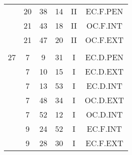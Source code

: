 \documentclass[12pt, a4paper]{article}
\begin{document}
\begin{multicols}{3}
{\begin{tabular}{c c c c c c}
	 	 	 	 & 20 & 38 & 14 & II & EC.F.PEN\\%
	 	 	 	 & 21 & 43 & 18 & II & OC.F.INT\\%
	 	 	 	 & 21 & 47 & 20 & II & OC.F.EXT\\%
	 	 	 	 & & & & & \\%
	 	 	 	27 & 7 & 9 & 31 & I & EC.D.PEN\\%
	 	 	 	 & 7 & 10 & 15 & I & EC.D.EXT\\%
	 	 	 	 & 7 & 13 & 53 & I & EC.D.INT\\%
	 	 	 	 & 7 & 48 & 34 & I & OC.D.EXT\\%
	 	 	 	 & 7 & 52 & 12 & I & OC.D.INT\\%
	 	 	 	 & 9 & 24 & 52 & I & EC.F.INT\\%
	 	 	 	 & 9 & 28 & 30 & I & EC.F.EXT\\%
	 	 \end{tabular}
 	}
\end{multicols}
\end{document}
